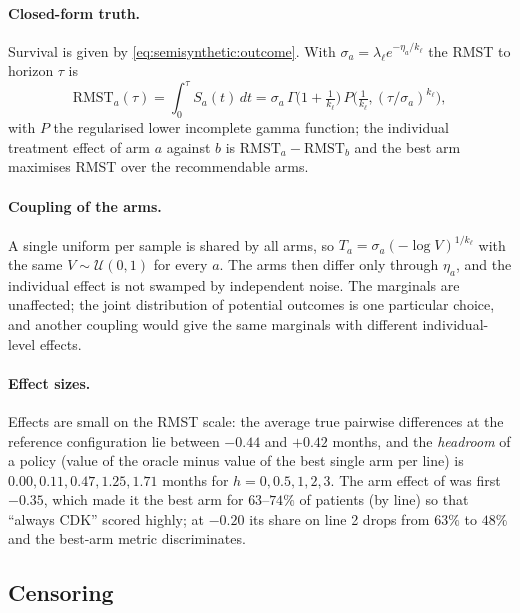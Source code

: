 \paragraph{Closed-form truth.} Survival is given by \eqref{eq:semisynthetic:outcome}. With
$\sigma_a=\lambda_\ell e^{-\eta_a/k_\ell}$ the RMST to horizon $\tau$ is
\begin{equation}
    \text{RMST}_a(\tau)=\int_0^{\tau}S_a(t)\,dt
    =\sigma_a\,\Gamma\!\big(1+\tfrac1{k_\ell}\big)\,P\!\big(\tfrac1{k_\ell},(\tau/\sigma_a)^{k_\ell}\big),
\end{equation}
with $P$ the regularised lower incomplete gamma function; the individual treatment effect of
arm $a$ against $b$ is $\text{RMST}_a-\text{RMST}_b$ and the best arm maximises RMST over the
recommendable arms.

\paragraph{Coupling of the arms.} A single uniform per sample is shared by all arms, so
$T_a=\sigma_a(-\log V)^{1/k_\ell}$ with the same $V\sim\mathcal{U}(0,1)$ for every $a$. The
arms then differ only through $\eta_a$, and the individual effect is not swamped by independent
noise. The marginals are unaffected; the joint distribution of potential outcomes is one
particular choice, and another coupling would give the same marginals with different
individual-level effects.

\paragraph{Effect sizes.} Effects are small on the RMST scale: the average true pairwise
differences at the reference configuration lie between $-0.44$ and $+0.42$ months, and the
\emph{headroom} of a policy (value of the oracle minus value of the best single arm per line)
is $0.00, 0.11, 0.47, 1.25, 1.71$ months for $h=0,0.5,1,2,3$. The arm effect of
 was first $-0.35$, which made it the best arm for $63$--$74\%$ of patients
(by line) so that ``always CDK'' scored highly; at $-0.20$ its share on line 2 drops from
$63\%$ to $48\%$ and the best-arm metric discriminates.

\subsection{Censoring}
\label{app:semisynthetic:censoring}

